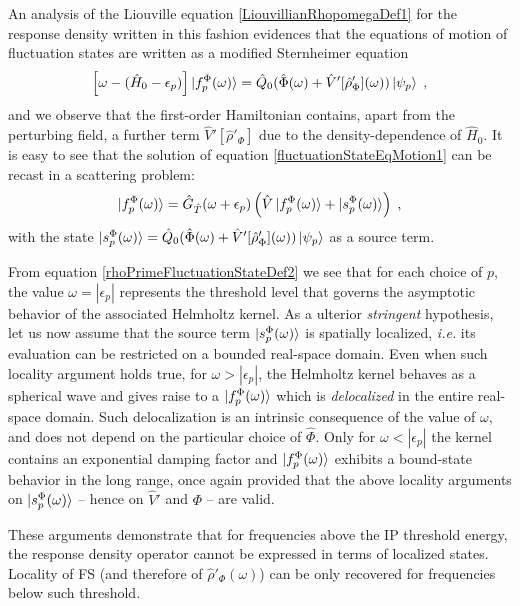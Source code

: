 \documentclass[reprint,aps,prb]{revtex4-1}
\newcommand{\eps}{\epsilon}
\newcommand{\be}{\begin{equation}}
\newcommand{\ee}{\end{equation}}
\newcommand{\lb}{\label}
\newcommand{\op}[1]{\hat {#1}}
\newcommand{\dm}{\op{\rho}}
\newcommand{\hnot}{\op{H}_0}
\newcommand{\GH}{\op G_{\op T}}
\begin{document}
An analysis of the Liouville equation \eqref{LiouvillianRhopomegaDef1} for the response density written in this fashion evidences that the equations of motion of fluctuation states  are
written as a modified Sternheimer equation~\cite{mahan1980,giustino2012,giustino2014}
\be\lb{fluctuationStateEqMotion1}
\left[\omega - (\hnot-\eps_p)\right]\ket{f_p^\Phi(\omega)} = \op Q_0(\op\Phi(\omega)+\op V'[\dm'_\Phi](\omega))\ket{\psi_p} \;,
\ee
and we observe that the first-order Hamiltonian contains,
apart from the perturbing field, a further term $\op V'[\dm'_\Phi]$ due to the density-dependence of $\hnot$.
It is easy to see that the solution of equation \eqref{fluctuationStateEqMotion1} can be recast in a scattering problem:
\be\lb{rhoPrimeFluctuationStateDef2}
\ket{f_p^\Phi(\omega)} = \GH(\omega+\epsilon_p)\left(\op V\ket{f_p^\Phi(\omega)} + \ket{s_p^\Phi(\omega)} \right)\;,
\ee
with the state
$
\ket{s_p^\Phi(\omega)} = \op Q_0(\op \Phi(\omega) +\op V'[\dm'_\Phi](\omega) )\ket{\psi_p}
$ as a source term.

From equation \eqref{rhoPrimeFluctuationStateDef2} we see that
for each choice of $p$, the value $\omega = |\eps_p|$ represents the threshold level that governs the asymptotic behavior of the associated Helmholtz kernel.
As a ulterior \emph{stringent} hypothesis, let us now assume that the source term $\ket{s_p^\Phi(\omega)}$ is spatially localized, \textit{i.e.} its evaluation can be restricted on a bounded real-space domain.
Even when such locality argument holds true, for $\omega > |\eps_p|$,
the Helmholtz kernel behaves as a spherical wave and  gives raise to a $\ket{f^\Phi_p(\omega)}$ which is \emph{delocalized} in the entire real-space domain.
Such delocalization is an intrinsic consequence of the value of $\omega$, and does not depend on the particular choice of
$\op \Phi$.
Only for $\omega < |\eps_p|$ the kernel contains an exponential damping factor and $\ket{f^\Phi_p(\omega)}$ exhibits a bound-state behavior in the long range,
once again provided that the above locality arguments on $\ket{s_p^\Phi(\omega)}$ -- hence on $\op V'$ and $\Phi$ -- are valid.

These arguments demonstrate that for frequencies above the IP threshold energy, the response density operator cannot be expressed in terms of localized states. Locality of FS (and therefore of $\dm'_\Phi(\omega)$) can be only recovered for frequencies below such threshold.
\end{document}
